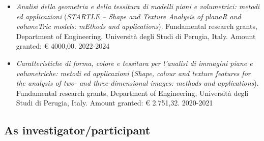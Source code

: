 \documentclass[11pt]{article}
\begin{document}
\begin{itemize}

\item \emph{Analisi della geometria e della tessitura di modelli piani e volumetrici: metodi ed applicazioni} (\emph{STARTLE -- Shape and Texture Analysis of planaR and volumeTric models: mEthods and applications}). Fundamental research grants, Department of Engineering, Università degli Studi di Perugia, Italy. Amount granted: € 4000,00. \hfill 2022-2024

	\item \emph{Caratteristiche di forma, colore e tessitura per l’analisi di immagini piane e volumetriche: metodi ed applicazioni} (\emph{Shape, colour and texture features for the analysis of two- and three-dimensional images: methods and applications}). Fundamental research grants, Department of Engineering, Università degli Studi di Perugia, Italy. Amount granted: € 2.751,32. \hfill 2020-2021
\end{itemize}

\subsection*{As investigator/participant}
\end{document}
